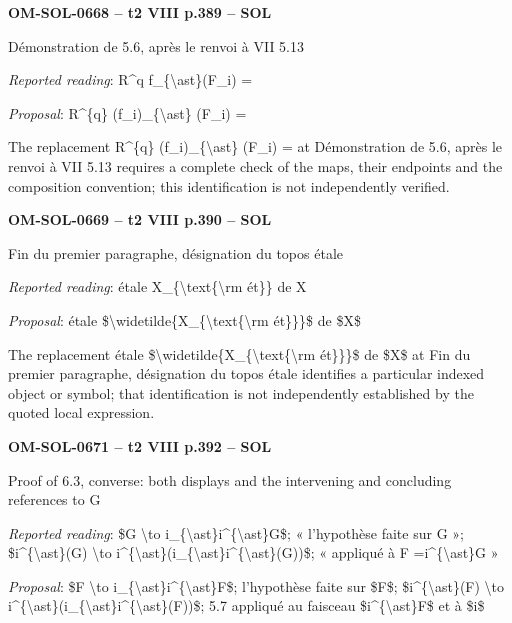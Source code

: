 \par\noindent\textbf{OM-SOL-0668 -- t2 VIII p.389 -- SOL}\par
Démonstration de 5.6, après le renvoi à VII 5.13\par
\emph{Reported reading}: R\textasciicircum{}q f\_\{\textbackslash{}ast\}(F\_i) =\par
\emph{Proposal}: R\textasciicircum{}\{q\} (f\_i)\_\{\textbackslash{}ast\} (F\_i) =\par
The replacement R\textasciicircum{}\{q\} (f\_i)\_\{\textbackslash{}ast\} (F\_i) = at Démonstration de 5.6, après le renvoi à VII 5.13 requires a complete check of the maps, their endpoints and the composition convention; this identification is not independently verified.\par
\par\noindent\textbf{OM-SOL-0669 -- t2 VIII p.390 -- SOL}\par
Fin du premier paragraphe, désignation du topos étale\par
\emph{Reported reading}: étale X\_\{\textbackslash{}text\{\textbackslash{}rm ét\}\} de X\par
\emph{Proposal}: étale \$\textbackslash{}widetilde\{X\_\{\textbackslash{}text\{\textbackslash{}rm ét\}\}\}\$ de \$X\$\par
The replacement étale \$\textbackslash{}widetilde\{X\_\{\textbackslash{}text\{\textbackslash{}rm ét\}\}\}\$ de \$X\$ at Fin du premier paragraphe, désignation du topos étale identifies a particular indexed object or symbol; that identification is not independently established by the quoted local expression.\par
\par\noindent\textbf{OM-SOL-0671 -- t2 VIII p.392 -- SOL}\par
Proof of 6.3, converse: both displays and the intervening and concluding references to G\par
\emph{Reported reading}: \$G \textbackslash{}to i\_\{\textbackslash{}ast\}i\textasciicircum{}\{\textbackslash{}ast\}G\$; « l'hypothèse faite sur G »; \$i\textasciicircum{}\{\textbackslash{}ast\}(G) \textbackslash{}to i\textasciicircum{}\{\textbackslash{}ast\}(i\_\{\textbackslash{}ast\}i\textasciicircum{}\{\textbackslash{}ast\}(G))\$; « appliqué à F =\allowbreak  i\textasciicircum{}\{\textbackslash{}ast\}G »\par
\emph{Proposal}: \$F \textbackslash{}to i\_\{\textbackslash{}ast\}i\textasciicircum{}\{\textbackslash{}ast\}F\$; l'hypothèse faite sur \$F\$; \$i\textasciicircum{}\{\textbackslash{}ast\}(F) \textbackslash{}to i\textasciicircum{}\{\textbackslash{}ast\}(i\_\{\textbackslash{}ast\}i\textasciicircum{}\{\textbackslash{}ast\}(F))\$; 5.7 appliqué au faisceau \$i\textasciicircum{}\{\textbackslash{}ast\}F\$ et à \$i\$\par
